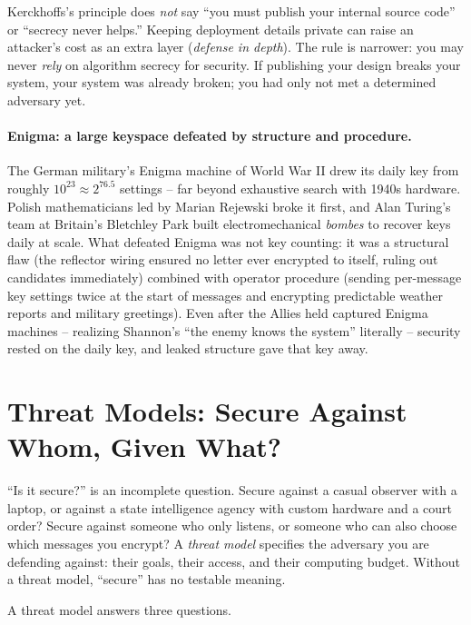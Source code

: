 \begin{trapbox}
Kerckhoffs's principle does \emph{not} say ``you must publish your internal source code'' or ``secrecy never helps.'' Keeping deployment details private can raise an attacker's cost as an extra layer (\emph{defense in depth}). The rule is narrower: you may never \emph{rely} on algorithm secrecy for security. If publishing your design breaks your system, your system was already broken; you had only not met a determined adversary yet.
\end{trapbox}

\paragraph{Enigma: a large keyspace defeated by structure and procedure.} The German military's Enigma machine of World War II drew its daily key from roughly $10^{23} \approx 2^{76.5}$ settings -- far beyond exhaustive search with 1940s hardware. Polish mathematicians led by Marian Rejewski broke it first, and Alan Turing's team at Britain's Bletchley Park built electromechanical \emph{bombes} to recover keys daily at scale. What defeated Enigma was not key counting: it was a structural flaw (the reflector wiring ensured no letter ever encrypted to itself, ruling out candidates immediately) combined with operator procedure (sending per-message key settings twice at the start of messages and encrypting predictable weather reports and military greetings). Even after the Allies held captured Enigma machines -- realizing Shannon's ``the enemy knows the system'' literally -- security rested on the daily key, and leaked structure gave that key away.

\section{Threat Models: Secure Against Whom, Given What?}
\label{ch01:threat-models}

``Is it secure?'' is an incomplete question. Secure against a casual observer with a laptop, or against a state intelligence agency with custom hardware and a court order? Secure against someone who only listens, or someone who can also choose which messages you encrypt? A \emph{threat model} specifies the adversary you are defending against: their goals, their access, and their computing budget. Without a threat model, ``secure'' has no testable meaning.

A threat model answers three questions.

